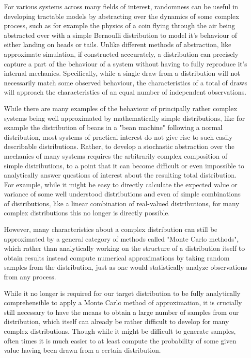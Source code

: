 For various systems across many fields of interest, randomness can be useful in developing tractable models by abstracting over the dynamics of some complex process, such as for example the physics of a coin flying through the air being abstracted over with a simple Bernoulli distribution to model it's behaviour of either landing on heads or tails. Unlike different methods of abstraction, like approximate simulation, if constructed acccurately, a distribution can precisely capture a part of the behaviour of a system without having to fully reproduce it's internal mechanics. Specifically, while a single draw from a distribution will not necessarily match some observed behaviour, the characteristics of a total of draws will approach the characteristics of an equal number of independent observations.

While there are many examples of the behaviour of principally rather complex systems being well approximated by mathematically simple distributions, like for example the distribution of beans in a "bean machine" following a normal distribution, most systems of practical interest do not give rise to such easily describable distributions. Rather, to develop a stochastic abstraction over the mechanics of many systems requires the arbitrarily complex composition of simple distributions, to a point that it can become difficult or even impossible to analytically answer questions of interest about the resulting total distribution. For example, while it might be easy to directly calculate the expected value or variance of some well understood distributions and even of simple combinations of distributions, like a linear combination of real-valued distributions, for many complex distributions this no longer is directly possible.

However, many characteristics about a complex distribution can still be approximated by a general category of methods called "Monte Carlo methods", which rather than analytically working on the structure of a distribution itself to obtain results instead compute numerical approximations by taking random samples from the distribution, just as one would statistically analyze observations from any process.

While it no longer is required for our target distribution to be fully analytically comprehensible to apply a Monte Carlo method of approximation, it is crucially still necessary to have the means to obtain a large number of samples from our distribution, which itself can already be rather difficult to develop for many complex distributions. Though while it might be difficult to generate samples, often times it is much easier to at least compute the probability of some given value having been drawn from a certain distribution.

